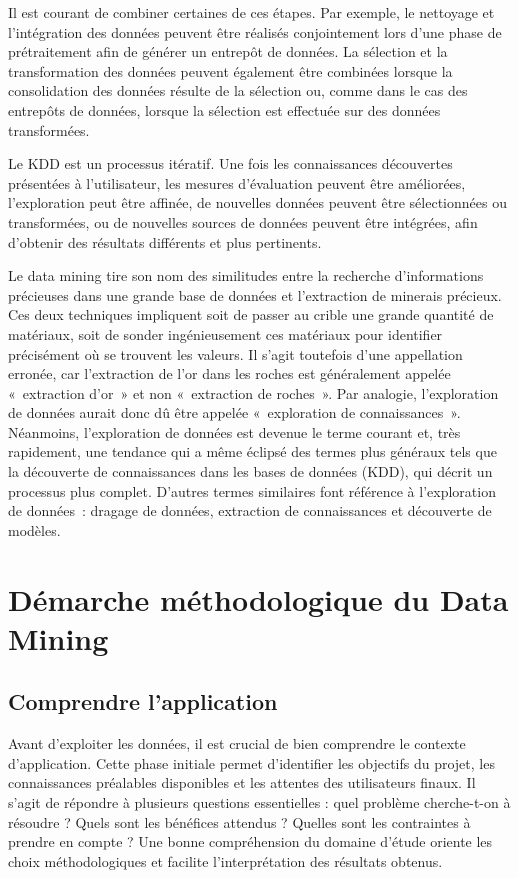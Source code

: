 \documentclass[a4paper,12pt]{report}
\begin{document}
Il est courant de combiner certaines de ces étapes. Par exemple, le nettoyage et l'intégration des données peuvent être réalisés conjointement lors d'une phase de prétraitement afin de générer un entrepôt de données. La sélection et la transformation des données peuvent également être combinées lorsque la consolidation des données résulte de la sélection ou, comme dans le cas des entrepôts de données, lorsque la sélection est effectuée sur des données transformées.

Le KDD est un processus itératif. Une fois les connaissances découvertes présentées à l'utilisateur, les mesures d'évaluation peuvent être améliorées, l'exploration peut être affinée, de nouvelles données peuvent être sélectionnées ou transformées, ou de nouvelles sources de données peuvent être intégrées, afin d'obtenir des résultats différents et plus pertinents.

Le data mining tire son nom des similitudes entre la recherche d'informations précieuses dans une grande base de données et l'extraction de minerais précieux. Ces deux techniques impliquent soit de passer au crible une grande quantité de matériaux, soit de sonder ingénieusement ces matériaux pour identifier précisément où se trouvent les valeurs. Il s'agit toutefois d'une appellation erronée, car l'extraction de l'or dans les roches est généralement appelée « extraction d'or » et non « extraction de roches ». Par analogie, l'exploration de données aurait donc dû être appelée « exploration de connaissances ». Néanmoins, l'exploration de données est devenue le terme courant et, très rapidement, une tendance qui a même éclipsé des termes plus généraux tels que la découverte de connaissances dans les bases de données (KDD), qui décrit un processus plus complet. D'autres termes similaires font référence à l'exploration de données : dragage de données, extraction de connaissances et découverte de modèles.

\section{Démarche méthodologique du Data Mining}
     \subsection{Comprendre l’application}
         Avant d’exploiter les données, il est crucial de bien comprendre le contexte d’application. Cette phase initiale permet d’identifier les objectifs du projet, les connaissances préalables disponibles et les attentes des utilisateurs finaux. Il s’agit de répondre à plusieurs questions essentielles : quel problème cherche-t-on à résoudre ? Quels sont les bénéfices attendus ? Quelles sont les contraintes à prendre en compte ? Une bonne compréhension du domaine d’étude oriente les choix méthodologiques et facilite l’interprétation des résultats obtenus.
\end{document}
